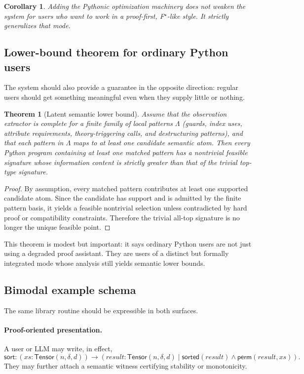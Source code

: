 \documentclass[11pt]{article}
\theoremstyle{definition}
\theoremstyle{plain}
\newtheorem{theorem}[definition]{Theorem}
\newtheorem{corollary}[definition]{Corollary}
\begin{document}
\begin{corollary}
Adding the Pythonic optimization machinery does not weaken the system for users
who want to work in a proof-first, F$^\star$-like style. It strictly generalizes
that mode.
\end{corollary}

\subsection{Lower-bound theorem for ordinary Python users}
The system should also provide a guarantee in the opposite direction: regular
users should get something meaningful even when they supply little or nothing.

\begin{theorem}[Latent semantic lower bound]
Assume that the observation extractor is complete for a finite family of local
patterns $\Lambda$ (guards, index uses, attribute requirements, theory-triggering
calls, and destructuring patterns), and that each pattern in $\Lambda$ maps to at
least one candidate semantic atom. Then every Python program containing at least
one matched pattern has a nontrivial feasible signature whose information content
is strictly greater than that of the trivial top-type signature.
\end{theorem}

\begin{proof}
By assumption, every matched pattern contributes at least one supported candidate
atom. Since the candidate has support and is admitted by the finite pattern basis,
it yields a feasible nontrivial selection unless contradicted by hard proof or
compatibility constraints. Therefore the trivial all-top signature is no longer
the unique feasible point.
\end{proof}

This theorem is modest but important: it says ordinary Python users are not just
using a degraded proof assistant. They are users of a distinct but formally
integrated mode whose analysis still yields semantic lower bounds.

\subsection{Bimodal example schema}
The same library routine should be expressible in both surfaces.

\paragraph{Proof-oriented presentation.}
A user or LLM may write, in effect,
\[
\mathsf{sort} : (xs : \mathsf{Tensor}(n,\delta,d)) \to
(result : \mathsf{Tensor}(n,\delta,d) \mid
\mathsf{sorted}(result) \wedge \mathsf{perm}(result,xs)).
\]
They may further attach a semantic witness certifying stability or monotonicity.
\end{document}
